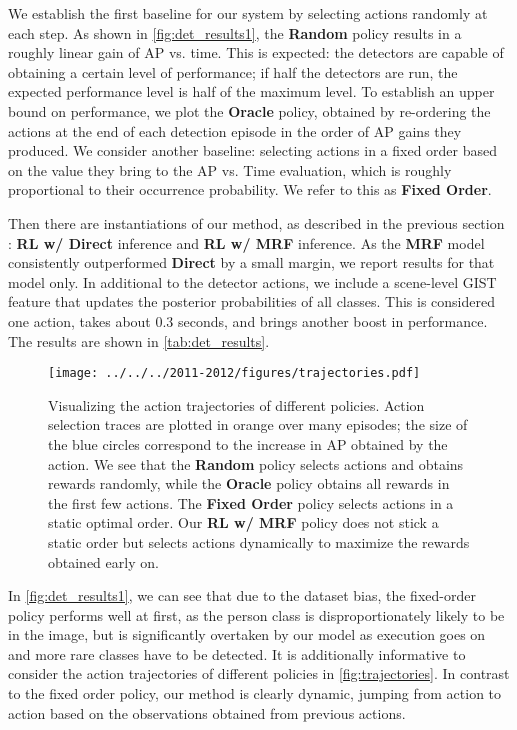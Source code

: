 We establish the first baseline for our system by selecting actions randomly at each step.
As shown in \autoref{fig:det_results1}, the \textbf{Random} policy results in a roughly linear gain of AP vs. time.
This is expected: the detectors are capable of obtaining a certain level of performance; if half the detectors are run, the expected performance level is half of the maximum level.
To establish an upper bound on performance, we plot the \textbf{Oracle} policy, obtained by re-ordering the actions at the end of each detection episode in the order of AP gains they produced.
We consider another baseline: selecting actions in a fixed order based on the value they bring to the AP vs. Time evaluation, which is roughly proportional to their occurrence probability.
We refer to this as \textbf{Fixed Order}.

Then there are instantiations of our method, as described in the previous section : \textbf{RL w/ Direct} inference and \textbf{RL w/ MRF} inference.
As the \textbf{MRF} model consistently outperformed \textbf{Direct} by a small margin, we report results for that model only.
In additional to the detector actions, we include a scene-level GIST feature that updates the posterior probabilities of all classes.
This is considered one action, takes about $0.3$ seconds, and brings another boost in performance.
The results are shown in \autoref{tab:det_results}.

\begin{figure}[h!]
  \centering
  \texttt{[image: ../../../2011-2012/figures/trajectories.pdf]}
  \caption{
Visualizing the action trajectories of different policies.
Action selection traces are plotted in orange over many episodes; the size of the blue circles correspond to the increase in AP obtained by the action.
We see that the \textbf{Random} policy selects actions and obtains rewards randomly, while the \textbf{Oracle} policy obtains all rewards in the first few actions.
The \textbf{Fixed Order} policy selects actions in a static optimal order.
Our \textbf{RL w/ MRF} policy does not stick a static order but selects actions dynamically to maximize the rewards obtained early on.
}
  \label{fig:trajectories}
\end{figure}

In \autoref{fig:det_results1}, we can see that due to the dataset bias, the fixed-order policy performs well at first, as the person class is disproportionately likely to be in the image, but is significantly overtaken by our model as execution goes on and more rare classes have to be detected.
It is additionally informative to consider the action trajectories of different policies in \autoref{fig:trajectories}.
In contrast to the fixed order policy, our method is clearly dynamic, jumping from action to action based on the observations obtained from previous actions.

